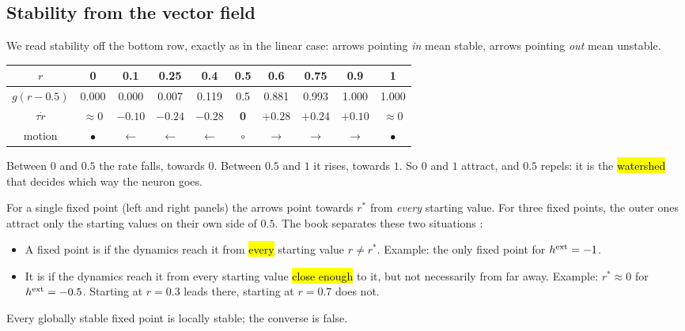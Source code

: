 \subsection{Stability from the vector field}

We read stability off the bottom row, exactly as in the linear case: arrows pointing \emph{in} mean stable, arrows pointing \emph{out} mean unstable.

\begin{example}[The sign of $\tau\dot r$ for $\hext = -0.5$]
\begin{center}
\renewcommand{\arraystretch}{1.2}
\begin{tabular}{c|ccccccccc}
$r$ & 0 & 0.1 & 0.25 & 0.4 & \textbf{0.5} & 0.6 & 0.75 & 0.9 & 1\\\hline
$g(r-0.5)$ & 0.000 & 0.000 & 0.007 & 0.119 & 0.5 & 0.881 & 0.993 & 1.000 & 1.000\\
$\tau\dot r$ & $\approx0$ & $-0.10$ & $-0.24$ & $-0.28$ & \textbf{0} & $+0.28$ & $+0.24$ & $+0.10$ & $\approx0$\\
motion & $\bullet$ & $\leftarrow$ & $\leftarrow$ & $\leftarrow$ & $\circ$ & $\rightarrow$ & $\rightarrow$ & $\rightarrow$ & $\bullet$\\
\end{tabular}
\end{center}
Between $0$ and $0.5$ the rate falls, towards $0$. Between $0.5$ and $1$ it rises, towards $1$. So $0$ and $1$ attract, and $0.5$ repels:
it is the \hl{watershed} that decides which way the neuron goes.
\end{example}

For a single fixed point (left and right panels) the arrows point towards $r^*$ from \emph{every} starting value. For three fixed points, the outer ones attract only the
starting values on their own side of $0.5$. The book separates these two situations :

\begin{defn}
\begin{itemize}
  \item A fixed point is  if the dynamics reach it from \hl{every} starting value $r\neq r^*$. Example: the only fixed point for $h^{\text{ext}}=-1$.
  \item It is  if the dynamics reach it from every starting value \hl{close enough} to it, but not necessarily from far away.
        Example: $r^*\approx0$ for $\hext=-0.5$. Starting at $r=0.3$ leads there, starting at $r=0.7$ does not.
\end{itemize}
Every globally stable fixed point is locally stable; the converse is false.
\end{defn}

